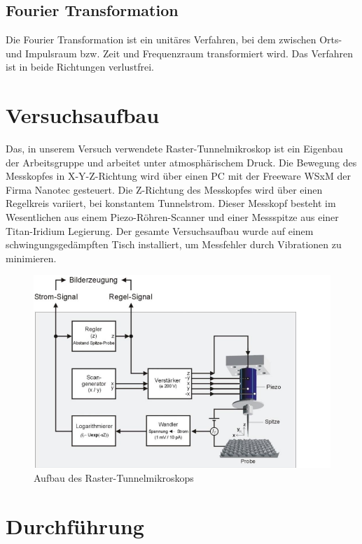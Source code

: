 \documentclass[10pt,a4paper]{article}
\begin{document}
\subsection{	Fourier Transformation}

Die Fourier Transformation ist ein unitäres Verfahren, bei dem zwischen Orts- und Impulsraum bzw. Zeit und Frequenzraum transformiert wird. Das Verfahren ist in beide Richtungen verlustfrei.

\section{	Versuchsaufbau}

Das, in unserem Versuch verwendete Raster-Tunnelmikroskop ist ein Eigenbau der Arbeitsgruppe und arbeitet unter atmosphärischem Druck. Die Bewegung des Messkopfes in X-Y-Z-Richtung wird über einen PC mit der Freeware WSxM der Firma Nanotec gesteuert. Die Z-Richtung des Messkopfes wird über einen Regelkreis variiert, bei konstantem Tunnelstrom. Dieser Messkopf besteht im Wesentlichen aus einem Piezo-Röhren-Scanner und einer Messspitze aus einer Titan-Iridium Legierung. Der gesamte Versuchsaufbau wurde auf einem schwingungsgedämpften Tisch installiert, um Messfehler durch Vibrationen zu minimieren.

\begin{figure}[h]
	\includegraphics[scale = 0.5]{aufbau.png}
	\centering
	\caption{Aufbau des Raster-Tunnelmikroskops}
	\label{diagramm_aufspaltung}
\end{figure}

\section{Durchführung}
\end{document}
